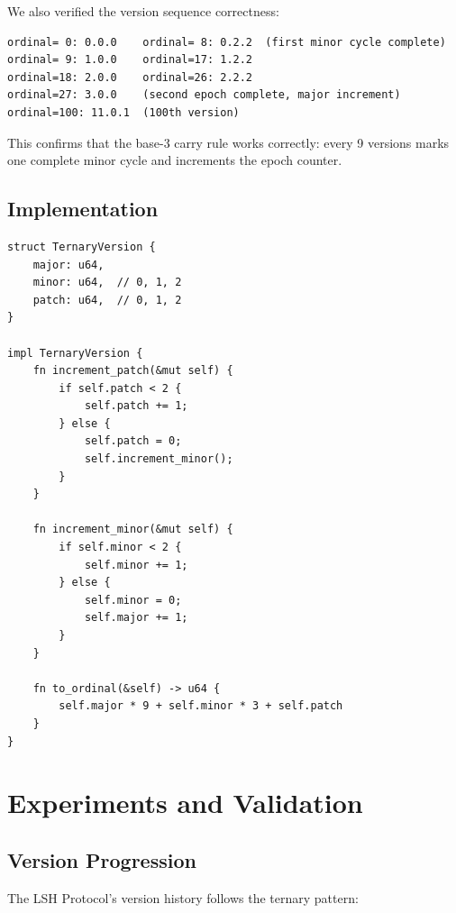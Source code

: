\documentclass{article}
\begin{document}
We also verified the version sequence correctness:

\begin{verbatim}
ordinal= 0: 0.0.0    ordinal= 8: 0.2.2  (first minor cycle complete)
ordinal= 9: 1.0.0    ordinal=17: 1.2.2
ordinal=18: 2.0.0    ordinal=26: 2.2.2
ordinal=27: 3.0.0    (second epoch complete, major increment)
ordinal=100: 11.0.1  (100th version)
\end{verbatim}

This confirms that the base-3 carry rule works correctly: every 9 versions marks one complete minor cycle and increments the epoch counter.

\subsection{Implementation}

\begin{verbatim}
struct TernaryVersion {
    major: u64,
    minor: u64,  // 0, 1, 2
    patch: u64,  // 0, 1, 2
}

impl TernaryVersion {
    fn increment_patch(&mut self) {
        if self.patch < 2 {
            self.patch += 1;
        } else {
            self.patch = 0;
            self.increment_minor();
        }
    }

    fn increment_minor(&mut self) {
        if self.minor < 2 {
            self.minor += 1;
        } else {
            self.minor = 0;
            self.major += 1;
        }
    }

    fn to_ordinal(&self) -> u64 {
        self.major * 9 + self.minor * 3 + self.patch
    }
}
\end{verbatim}

\section{Experiments and Validation}

\subsection{Version Progression}

The LSH Protocol's version history follows the ternary pattern:
\end{document}
